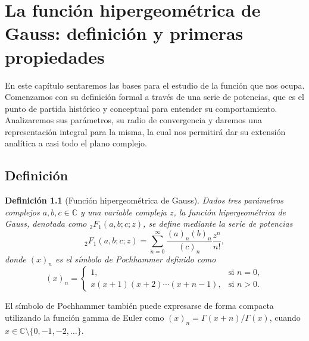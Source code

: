 \documentclass[12pt,a4paper]{book}
\newtheorem{definition}[theorem]{Definición}
\begin{document}
\chapter[Definición y primeras propiedades]{La función hipergeométrica de Gauss: definición y primeras propiedades}
\label{chap:funcion_hipergeometrica}

En este capítulo sentaremos las bases para el estudio de la función que nos ocupa. Comenzamos con su definición formal a través de una serie de potencias, que es el punto de partida histórico y conceptual para entender su comportamiento. Analizaremos sus parámetros, su radio de convergencia y daremos una representación integral para la misma, la cual nos permitirá dar su extensión analítica a casi todo el plano complejo.

\section{Definición}
\label{sec:definicion_propiedades}

\begin{definition}[Función hipergeométrica de Gauss]
Dados tres parámetros complejos $a, b, c \in \mathbb{C}$ y una variable compleja $z$, la función hipergeométrica de Gauss, denotada como ${}_{2}F_{1}(a,b;c;z)$, se define mediante la serie de potencias
\[
{}_{2}F_{1}(a,b;c;z) = \sum_{n=0}^{\infty} \frac{(a)_n (b)_n}{(c)_n} \frac{z^n}{n!},
\]
donde $(x)_n$ es el símbolo de Pochhammer definido como
\[
(x)_n = 
\begin{cases}
1, & \text{si } n=0, \\
x(x+1)(x+2)\cdots(x+n-1), & \text{si } n > 0.
\end{cases}
\]
\end{definition}
El símbolo de Pochhammer también puede expresarse de forma compacta utilizando la función gamma de Euler como $(x)_n = \Gamma(x+n)/\Gamma(x)$, cuando $x \in \mathbb{C} \setminus \{0,-1,-2,\dots\} $.
\end{document}
